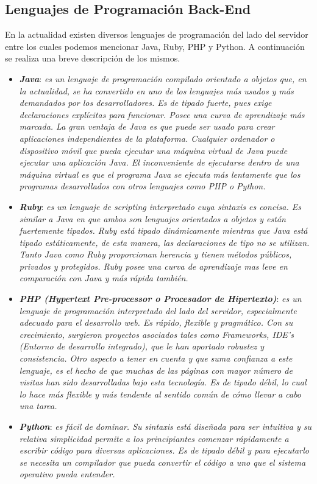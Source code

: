 \documentclass[11pt,oneside]{book}
\begin{document}
\subsection{Lenguajes de Programación Back-End}
En la actualidad existen diversos lenguajes de programación del lado del servidor entre los cuales podemos mencionar Java, Ruby, PHP y Python. A continuación se realiza una breve descripción de los mismos. 
\begin{itemize}
\item \textit{\textbf{Java}}: \textit{es un lenguaje de programación compilado orientado a objetos que, en la actualidad, se ha convertido en uno de los lenguajes más usados y más demandados por los desarrolladores. Es de tipado fuerte, pues exige declaraciones explícitas para funcionar. Posee una curva de aprendizaje más marcada. La gran ventaja de Java es que puede ser usado para crear aplicaciones independientes de la plataforma. Cualquier ordenador o dispositivo móvil que pueda ejecutar una máquina virtual de Java puede ejecutar una aplicación Java. El inconveniente de ejecutarse dentro de una máquina virtual es que el programa Java se ejecuta más lentamente que los programas desarrollados con otros lenguajes como PHP o Python.}

\item \textit{\textbf{Ruby}}: \textit{es un lenguaje de scripting interpretado cuya sintaxis es concisa. Es similar a Java en que ambos son lenguajes orientados a objetos y están fuertemente tipados. Ruby está tipado dinámicamente mientras que Java está tipado estáticamente, de esta manera, las declaraciones de tipo no se utilizan. Tanto Java como Ruby proporcionan herencia y tienen métodos públicos, privados y protegidos. Ruby posee una curva de aprendizaje mas leve en comparación con Java y más rápida también.}

\item \textit{\textbf{PHP (Hypertext Pre-processor o Procesador de Hipertexto)}}: \textit{es un lenguaje de programación interpretado del lado del servidor, especialmente adecuado para el desarrollo web. Es rápido, flexible y pragmático. Con su crecimiento, surgieron proyectos asociados tales como Frameworks, IDE’s (Entorno de desarrollo integrado), que le han aportado robustez y consistencia. Otro aspecto a tener en cuenta y que suma confianza a este lenguaje, es el hecho de que muchas de las páginas con mayor número de visitas han sido desarrolladas bajo esta tecnología. Es de tipado débil, lo cual lo hace más flexible y más tendente al sentido común de cómo llevar a cabo una tarea.}

\item \textit{\textbf{Python}}: \textit{es fácil de dominar. Su sintaxis está diseñada para ser intuitiva y su relativa simplicidad permite a los principiantes comenzar rápidamente a escribir código para diversas aplicaciones. Es de tipado débil y para ejecutarlo se necesita un compilador que pueda convertir el código a uno que el sistema operativo pueda entender.}
\end{itemize}
\end{document}
